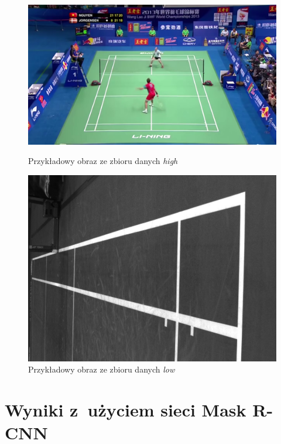 \begin{figure}[!htb]
    \includegraphics[width=\linewidth]{../badminton/datasets/badminton_high/train/test_court2-00002.png}
    \caption{Przykładowy obraz ze zbioru danych \textit{high}}
  \endminipage\hfill
    \includegraphics[width=\linewidth]{../badminton/datasets/badminton_low/train/1564909032792410075.jpg}
    \caption{Przykładowy obraz ze zbioru danych \textit{low}}
  \endminipage\hfill
  \end{figure}

\section{Wyniki z~użyciem sieci Mask R-CNN}

